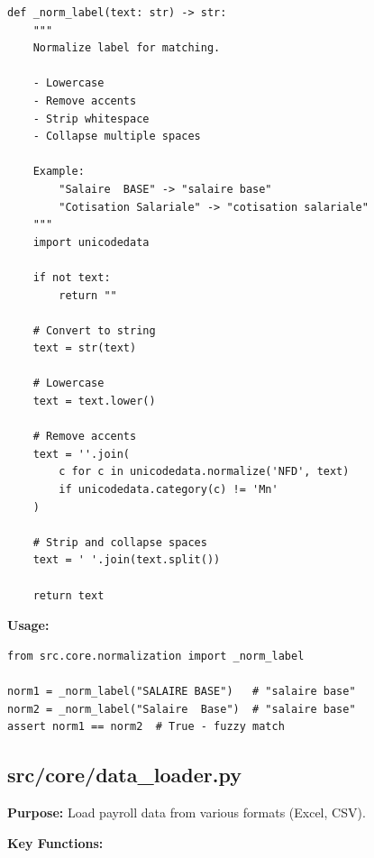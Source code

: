\begin{lstlisting}[style=pythonstyle]
def _norm_label(text: str) -> str:
    """
    Normalize label for matching.
    
    - Lowercase
    - Remove accents
    - Strip whitespace
    - Collapse multiple spaces
    
    Example:
        "Salaire  BASE" -> "salaire base"
        "Cotisation Salariale" -> "cotisation salariale"
    """
    import unicodedata
    
    if not text:
        return ""
    
    # Convert to string
    text = str(text)
    
    # Lowercase
    text = text.lower()
    
    # Remove accents
    text = ''.join(
        c for c in unicodedata.normalize('NFD', text)
        if unicodedata.category(c) != 'Mn'
    )
    
    # Strip and collapse spaces
    text = ' '.join(text.split())
    
    return text
\end{lstlisting}

\textbf{Usage:}
\begin{lstlisting}[style=pythonstyle]
from src.core.normalization import _norm_label

norm1 = _norm_label("SALAIRE BASE")   # "salaire base"
norm2 = _norm_label("Salaire  Base")  # "salaire base"
assert norm1 == norm2  # True - fuzzy match
\end{lstlisting}

\subsection{src/core/data\_loader.py}

\textbf{Purpose:} Load payroll data from various formats (Excel, CSV).

\textbf{Key Functions:}


